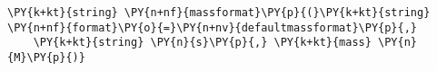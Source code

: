 \begin{Verbatim}[commandchars=\\\{\}]
    \PY{k+kt}{string} \PY{n+nf}{massformat}\PY{p}{(}\PY{k+kt}{string} \PY{n+nf}{format}\PY{o}{=}\PY{n+nv}{defaultmassformat}\PY{p}{,}
    \PY{k+kt}{string} \PY{n}{s}\PY{p}{,} \PY{k+kt}{mass} \PY{n}{M}\PY{p}{)}
\end{Verbatim}
